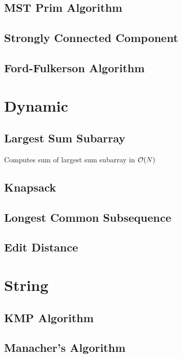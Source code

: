 \documentclass[landscape,8pt]{article}
\begin{document}
\begin{multicols}{2}
  \subsection{MST Prim Algorithm}

  \subsection{Strongly Connected Component}

  \subsection{Ford-Fulkerson Algorithm}
\columnbreak

\section{Dynamic}
  \subsection{Largest Sum Subarray}
  Computes sum of largest sum subarray in $\order{N}$
  

  \subsection{Knapsack}

  \subsection{Longest Common Subsequence}
    
  \subsection{Edit Distance}

\section{String}
  \subsection{KMP Algorithm}

  \subsection{Manacher's Algorithm}


\end{multicols}
\end{document}
